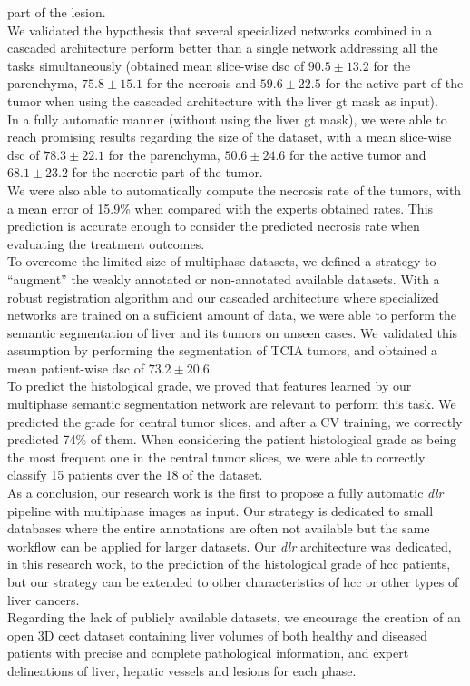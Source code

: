 part of the lesion. \\
We validated the hypothesis that several specialized networks combined
in a cascaded architecture perform better than a single network
addressing all the tasks simultaneously (obtained mean slice-wise \ac{dsc} of
$ 90.5 \pm 13.2 $ for the parenchyma, $ 75.8 \pm 15.1 $ for the necrosis and $ 59.6 \pm
22.5 $ for the active part of the tumor when using the cascaded
architecture with the liver \ac{gt} mask as input).\\
In a fully automatic manner (without using the liver \ac{gt} mask), we were
able to reach promising results regarding the size of the dataset, with
a mean slice-wise \ac{dsc} of $ 78.3 \pm 22.1 $ for the parenchyma, $ 50.6 \pm 24.6 $ for
the active tumor and $ 68.1 \pm 23.2 $ for the necrotic part of the tumor.\\
We were also able to automatically compute the necrosis rate of the
tumors, with a mean error of 15.9\% when compared with the experts
obtained rates. This prediction is accurate enough to consider the
predicted necrosis rate when evaluating the treatment outcomes. \\
To overcome the limited size of multiphase datasets, we defined a
strategy to ``augment'' the weakly annotated or non-annotated available
datasets.
With a robust registration algorithm and our cascaded architecture where
specialized networks are trained on a sufficient amount of data, we were
able to perform the semantic segmentation of liver and its tumors on
unseen cases.
We validated this assumption by performing the segmentation of TCIA
tumors, and obtained a mean patient-wise \ac{dsc} of $ 73.2 \pm 20.6 $.\\
To predict the histological grade, we proved that features learned by
our multiphase semantic segmentation network are relevant to perform
this task.
We predicted the grade for central tumor slices, and after a CV
training, we correctly predicted 74\% of them. When considering the
patient histological grade as being the most frequent one in the central
tumor slices, we were able to correctly classify 15 patients over the 18
of the dataset.\\
As a conclusion, our research work is the first to propose a fully
automatic \emph{\ac{dlr}} pipeline with multiphase images as input. Our
strategy is dedicated to small databases where the entire annotations
are often not available but the same workflow can be applied for larger
datasets. Our \emph{\ac{dlr}} architecture was dedicated, in this research
work, to the prediction of the histological grade of \ac{hcc} patients, but
our strategy can be extended to other characteristics of \ac{hcc} or other
types of liver cancers.\\
Regarding the lack of publicly available datasets, we encourage the
creation of an open 3D \ac{cect} dataset containing liver volumes of both
healthy and diseased patients with precise and complete pathological
information, and expert delineations of liver, hepatic vessels and
lesions for each phase.


